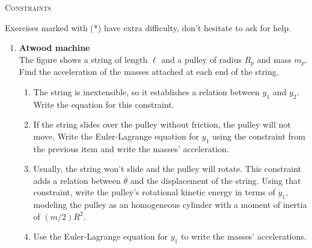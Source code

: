 \documentclass[11pt, a4paper, twoside]{article}
\begin{document}
\begin{center}
  \textsc{\large Constraints}
\end{center}

\noindent
Exercises marked with (*) have extra difficulty, don't hesitate to ask for help.

\begin{enumerate}

\item 
	\begin{minipage}[t][3cm]{0.72\textwidth}
		\textbf{Atwood machine}\\
		The figure shows a string of length \(\ell\) and a pulley of radius \(R_p\) and mass \(m_p\).
		Find the acceleration of the masses attached at each end of the string.
	\end{minipage}
	\begin{minipage}[c][3cm][t]{0.2\textwidth}
		
	\end{minipage}
		\begin{enumerate}
			\item The string is inextensible, so it establishes a relation between \(y_1\) and \(y_2\).
			Write the equation for this constraint.
			\item If the string slides over the pulley without friction, the pulley will not move.
			Write the Euler-Lagrange equation for \(y_1\) using the constraint from the previous item and write the masses' acceleration.
			\item Usually, the string won't slide and the pulley will rotate.
			This constraint adds a relation between \(\theta\) and the displacement of the string.
			Using that constraint, write the pulley's rotational kinetic energy in terms of \(\dot{y}_1\), modeling the pulley as an homogeneous cylinder with a moment of inertia of \((m/2) R^2\).
			\item Use the Euler-Lagrange equation for \(y_1\) to write the masses' accelerations.
		\end{enumerate}
	

\end{enumerate}
\end{document}
